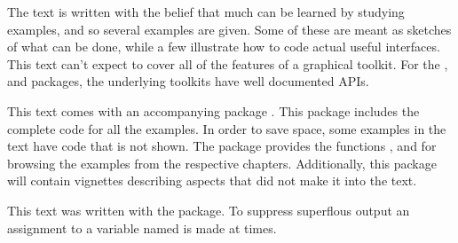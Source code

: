 The text is written with the belief that much can be learned by
studying examples, and so several examples are given. Some of these
are meant as sketches of what can be done, while a few illustrate how
to code actual useful interfaces.  This text can't expect to cover all
of the features of a graphical toolkit. For the ,
 and  packages, the underlying toolkits have
well documented APIs.


This text comes with an accompanying package \pkg{\PACKAGENAME}. This
package includes the complete code for all the examples. In order to
save space, some examples in the text have code that is not shown. The
package provides the functions ,
 and  for browsing the
examples from the respective chapters. Additionally, this package will
contain vignettes describing aspects that did not make it into the
text.


This text was written with the  package. To suppress
superflous output an assignment to a variable named  is made
at times.
 


